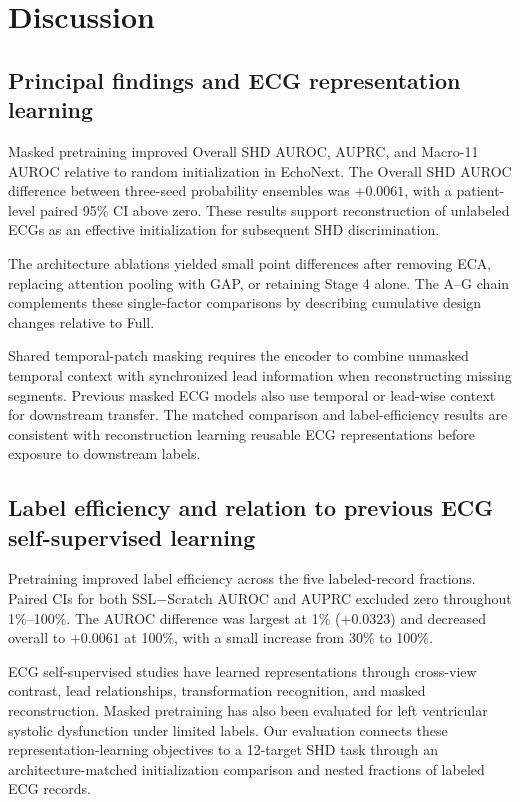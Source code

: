 \section{Discussion}
\label{sec:discussion}

\subsection{Principal findings and ECG representation learning}
\label{sec:discussion_findings}

Masked pretraining improved Overall SHD AUROC, AUPRC, and Macro-11 AUROC relative to random initialization in EchoNext. The Overall SHD AUROC difference between three-seed probability ensembles was $+0.0061$, with a patient-level paired 95\% CI above zero. These results support reconstruction of unlabeled ECGs as an effective initialization for subsequent SHD discrimination.

The architecture ablations yielded small point differences after removing ECA, replacing attention pooling with GAP, or retaining Stage 4 alone. The A--G chain complements these single-factor comparisons by describing cumulative design changes relative to Full.

Shared temporal-patch masking requires the encoder to combine unmasked temporal context with synchronized lead information when reconstructing missing segments. Previous masked ECG models also use temporal or lead-wise context for downstream transfer\cite{zhang2023maefe,na2024stmem,ran_joint_masking_2024,sawano_masked_lvsd_2024}. The matched comparison and label-efficiency results are consistent with reconstruction learning reusable ECG representations before exposure to downstream labels.

\subsection{Label efficiency and relation to previous ECG self-supervised learning}
\label{sec:discussion_label_efficiency}

Pretraining improved label efficiency across the five labeled-record fractions. Paired CIs for both SSL$-$Scratch AUROC and AUPRC excluded zero throughout 1\%--100\%. The AUROC difference was largest at 1\% ($+0.0323$) and decreased overall to $+0.0061$ at 100\%, with a small increase from 30\% to 100\%.

ECG self-supervised studies have learned representations through cross-view contrast, lead relationships, transformation recognition, and masked reconstruction\cite{kiyasseh2021clocs,mehari2022ssl,oh2022leadagnostic,zhang_reverse_2023,zhang2023maefe,na2024stmem}. Masked pretraining has also been evaluated for left ventricular systolic dysfunction under limited labels\cite{sawano_masked_lvsd_2024}. Our evaluation connects these representation-learning objectives to a 12-target SHD task through an architecture-matched initialization comparison and nested fractions of labeled ECG records.

